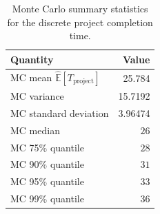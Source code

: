 \begin{table}
\caption{Monte Carlo summary statistics for the discrete project completion time.}
\label{tab:completion_time_summary}
\begin{tabular}{lr}
\toprule
Quantity & Value \\
\midrule
MC mean $\widehat{\mathbb{E}}[T_{\mathrm{project}}]$ & 25.784 \\
MC variance & 15.7192 \\
MC standard deviation & 3.96474 \\
MC median & $26$ \\
MC 75\% quantile & $28$ \\
MC 90\% quantile & $31$ \\
MC 95\% quantile & $33$ \\
MC 99\% quantile & $36$ \\
\bottomrule
\end{tabular}
\end{table}
